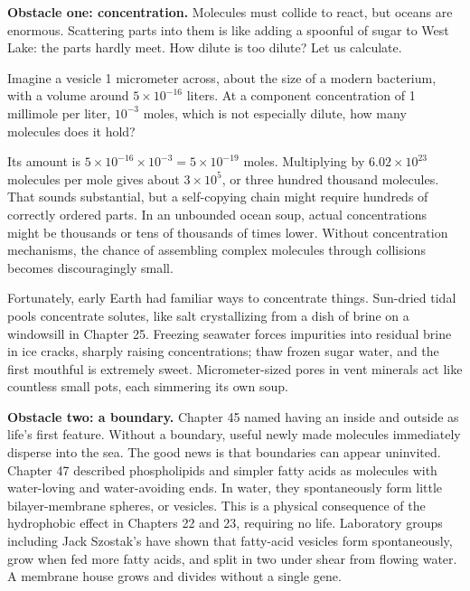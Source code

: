 \textbf{Obstacle one: concentration.} Molecules must collide to react, but oceans are enormous. Scattering parts into them is like adding a spoonful of sugar to West Lake: the parts hardly meet. How dilute is too dilute? Let us calculate.

\begin{qiaoliang}
Imagine a vesicle 1 micrometer across, about the size of a modern bacterium, with a volume around $5\times 10^{-16}$ liters. At a component concentration of 1 millimole per liter, $10^{-3}$ moles, which is not especially dilute, how many molecules does it hold?

Its amount is $5\times 10^{-16}\times 10^{-3}=5\times 10^{-19}$ moles. Multiplying by $6.02\times 10^{23}$ molecules per mole gives about $3\times 10^{5}$, or three hundred thousand molecules. That sounds substantial, but a self-copying chain might require hundreds of correctly ordered parts. In an unbounded ocean soup, actual concentrations might be thousands or tens of thousands of times lower. Without concentration mechanisms, the chance of assembling complex molecules through collisions becomes discouragingly small.
\end{qiaoliang}

Fortunately, early Earth had familiar ways to concentrate things. Sun-dried tidal pools concentrate solutes, like salt crystallizing from a dish of brine on a windowsill in Chapter 25. Freezing seawater forces impurities into residual brine in ice cracks, sharply raising concentrations; thaw frozen sugar water, and the first mouthful is extremely sweet. Micrometer-sized pores in vent minerals act like countless small pots, each simmering its own soup.

\textbf{Obstacle two: a boundary.} Chapter 45 named having an inside and outside as life's first feature. Without a boundary, useful newly made molecules immediately disperse into the sea. The good news is that boundaries can appear uninvited. Chapter 47 described phospholipids and simpler fatty acids as molecules with water-loving and water-avoiding ends. In water, they spontaneously form little bilayer-membrane spheres, or vesicles. This is a physical consequence of the hydrophobic effect in Chapters 22 and 23, requiring no life. Laboratory groups including Jack Szostak's have shown that fatty-acid vesicles form spontaneously, grow when fed more fatty acids, and split in two under shear from flowing water. A membrane house grows and divides without a single gene.

\begin{center}
\end{center}

